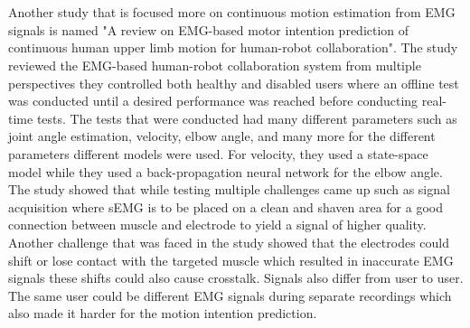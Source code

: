 \\\\
Another study that is focused more on continuous motion estimation from EMG signals is named "A review on EMG-based motor intention prediction of continuous human upper limb motion for human-robot collaboration"\cite{continuousemg}.
The study reviewed the EMG-based human-robot collaboration system from multiple perspectives they controlled both healthy and disabled users where an offline test was conducted until a desired performance was reached before conducting
real-time tests. The tests that were conducted had many different parameters such as joint angle estimation, velocity, elbow angle, and many more for the different parameters different models were used. 
For velocity, they used a state-space model while they used a back-propagation neural network for the elbow angle. The study showed that while testing multiple challenges came up such as signal acquisition where sEMG
is to be placed on a clean and shaven area for a good connection between muscle and electrode to yield a signal of higher quality. Another challenge that was faced in the study showed that the electrodes could shift or lose contact 
with the targeted muscle which resulted in inaccurate EMG signals these shifts could also cause crosstalk. Signals also differ from user to user. The same user could be different EMG signals during separate recordings which also made it 
harder for the motion intention prediction.